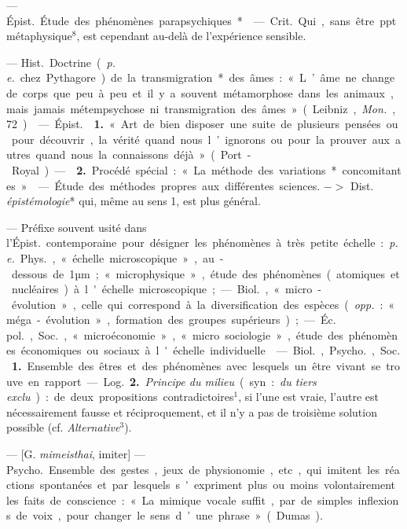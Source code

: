 \begin{itemize}[leftmargin=1cm, label=, itemsep=1pt]
 — \si{Épist.} Étude des phénomènes parapsychiques*.

 — \si{Crit.} Qui, sans être ppt. métaphysique$^8$, est
cependant au-delà de l'expérience sensible.

 — \si{Hist.} Doctrine ({\it p. e.} chez Pythagore) de la
transmigration* des âmes : « L’âme ne change de corps que peu à peu. et il y
a souvent métamorphose dans les animaux, mais jamais métempsychose ni
transmigration des âmes » (Leibniz, {\it Mon.}, 72).

 — \si{Épist.}  {\bf 1.} « Art de bien disposer
une suite de plusieurs pensées ou pour découvrir, la vérité
quand nous l’ignorons ou pour la prouver aux autres quand nous la connaissons
déjà » (Port-Royal). —  {\bf 2.} Procédé spécial : « La
méthode des variations* concomitantes ».

 — Étude des méthodes propres aux différentes sciences. $->$
Dist. {\it épistémologie}* qui, même au sens 1, est plus général.

 — Préfixe souvent usité dans l'\si{Épist.} contemporaine pour
désigner les phénomènes à très petite échelle : {\it p. e.} \si{Phys.},
« échelle microscopique », au-dessous de 1µm ; « microphysique », étude des
phénomènes (atomiques et nucléaires) à l'échelle microscopique; — \si{Biol.},
« micro-évolution », celle qui correspond à la diversification des espèces
({\it opp.} : « méga-évolution », formation des groupes supérieurs) ; —
\si{Éc. pol.}, \si{Soc.}, « microéconomie », « micro sociologie », étude des
phénomènes économiques ou sociaux à l'échelle individuelle.

 — \si{Biol.}, \si{Psycho.}, \si{Soc.} {\bf 1.} Ensemble des êtres
et des phénomènes avec lesquels un être vivant se trouve en rapport.

— \si{Log.} {\bf 2.} {\it Principe du milieu} (syn. : {\it du tiers exclu}) :
de deux propositions contradictoires$^1$, si l’une est vraie, l’autre est
nécessairement fausse et réciproquement, et il n’y a pas de troisième
solution possible (cf. {\it Alternative}$^3$).

 — [G. {\it mimeisthai}, imiter] — \si{Psycho.} Ensemble des
gestes, jeux de physionomie, etc, qui imitent les réactions spontanées et par
lesquels s'expriment plus ou moins volontairement les faits de conscience :
« La mimique vocale suffit, par de simples inflexions de voix, pour changer
le sens d’une phrase » (Dumas).


\end{itemize}
